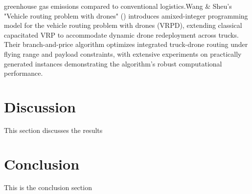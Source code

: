 \documentclass{article}
\begin{document}
greenhouse gas emissions compared to conventional logistics.Wang & Sheu's "Vehicle routing problem with drones" (\cite{WOS:000465060600016}) introduces a ​​mixed-integer programming model​​ for the ​​vehicle routing problem with drones (VRPD)​​, extending classical capacitated VRP to accommodate dynamic drone redeployment across trucks. Their ​​branch-and-price algorithm​​ optimizes integrated truck-drone routing under flying range and payload constraints, with ​​extensive experiments on practically generated instances​​ demonstrating the algorithm’s ​​robust computational performance​​.



\section{Discussion}
This section discusses the results

\section{Conclusion}
This is the conclusion section

\printbibliography
\end{document}
